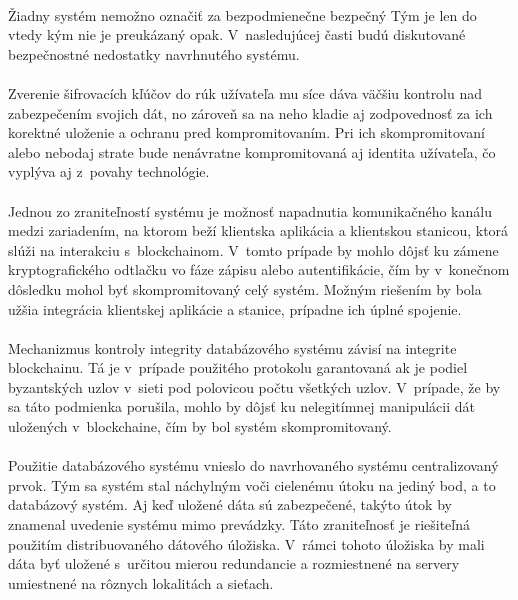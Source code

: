 \paragraph{}
Žiadny systém nemožno označiť za bezpodmienečne bezpečný Tým je len do vtedy kým nie je preukázaný opak. V~nasledujúcej časti budú diskutované bezpečnostné nedostatky navrhnutého systému.
\paragraph{}

Zverenie šifrovacích kľúčov do rúk užívateľa mu síce dáva väčšiu kontrolu nad zabezpečením svojich dát, no zároveň sa na neho kladie aj zodpovednosť za ich korektné uloženie a ochranu pred kompromitovaním. Pri ich skompromitovaní alebo nebodaj strate bude nenávratne kompromitovaná aj identita užívateľa, čo vyplýva aj z~povahy technológie.
\paragraph{}

Jednou zo zraniteľností systému je možnosť napadnutia komunikačného kanálu medzi zariadením, na ktorom beží klientska aplikácia a klientskou stanicou, ktorá slúži na interakciu s~blockchainom. V~tomto prípade by mohlo dôjsť ku zámene kryptografického odtlačku vo fáze zápisu alebo autentifikácie, čím by v~konečnom dôsledku mohol byť skompromitovaný celý systém. Možným riešením by bola užšia integrácia klientskej aplikácie a stanice, prípadne ich úplné spojenie.
\paragraph{}

Mechanizmus kontroly integrity databázového systému závisí na integrite blockchainu. Tá je v~prípade použitého protokolu garantovaná ak je podiel byzantských uzlov v~sieti pod polovicou počtu všetkých uzlov. V~prípade, že by sa táto podmienka porušila, mohlo by dôjsť ku nelegitímnej manipulácii dát uložených v~blockchaine, čím by bol systém skompromitovaný.
\paragraph{}

Použitie databázového systému vnieslo do navrhovaného systému centralizovaný prvok. Tým sa systém stal náchylným voči cielenému útoku na jediný bod, a to databázový systém. Aj keď uložené dáta sú zabezpečené, takýto útok by znamenal uvedenie systému mimo prevádzky. Táto zraniteľnosť je riešiteľná použitím distribuovaného dátového úložiska. V~rámci tohoto úložiska by mali dáta byť uložené s~určitou mierou redundancie a rozmiestnené na servery umiestnené na rôznych lokalitách a sieťach.

